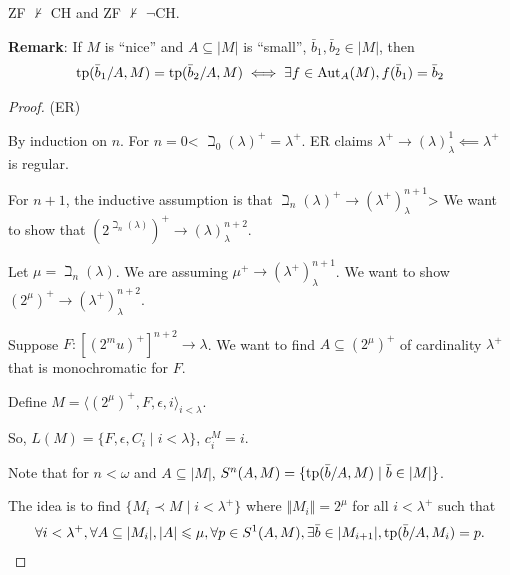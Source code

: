 \documentclass{report}
\begin{document}
ZF $\not\vdash$ CH and ZF $\not\vdash$ $\neg$CH.


\noindent \textbf{Remark}: If $M$ is ``nice'' and $A \subseteq |M|$ is ``small'', $\bar b_1 , \bar b_2 \in |M|$, then
\begin{align*}
    \text{tp}(\bar b_1 / A, M) = \text{tp}(\bar b_2 / A, M) \iff \exists f \in \operatorname{Aut}_A(M), f(\bar b_1) = \bar b_2
\end{align*}
\begin{proof} (ER)

    By induction on $n$. For $n = 0$< $\beth_0(\lambda)^+ = \lambda^+$. ER claims $\lambda^+ \to (\lambda)^1_\lambda \impliedby \lambda^+$ is regular.

    For $n+1$, the inductive assumption is that $\beth_n(\lambda)^+ \to (\lambda^+)^{n+1}_\lambda$> We want to show that $\left(2^{\beth_n(\lambda)}\right)^+ \to (\lambda)_\lambda^{n+2}$. 

    Let $\mu = \beth_n(\lambda)$. We are assuming $\mu^+ \to (\lambda^+)^{n+1}_\lambda$. We want to show $(2^\mu)^+ \to (\lambda^+)^{n+2}_\lambda$. 

    Suppose $F: [(2^mu)^+]^{n + 2} \to \lambda$. We want to find $A \subseteq (2^{\mu})^+$ of cardinality $\lambda^+$ that is monochromatic for $F$. 

    Define $M = \langle (2^\mu)^+, F, \epsilon, i\rangle_{i < \lambda}$.
    
    So, $L(M) = \{F, \epsilon, C_i \mid i < \lambda \}$, $c_i^M = i$.

    Note that for $n < \omega$ and $A \subseteq |M|$, $S^n(A, M) = \{\text{tp}(\bar b / A, M) \mid \bar b \in |M| \}$. 

    The idea is to find $\{M_i \prec M \mid i < \lambda^+\}$ where $\Vert M_i \Vert=  2^\mu$ for all $i < \lambda^+$ such that 
    \begin{align*}
        \forall i < \lambda^+, \forall A \subseteq |M_i|, |A| \leqslant \mu, \forall p \in S^1(A, M), \exists \bar b \in |M_{i+1}|, \text{tp}(\bar b / A, M_i) = p.
    \end{align*}
    
\end{proof}
\end{document}
